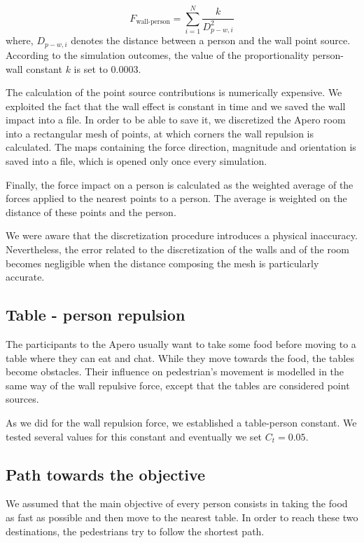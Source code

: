 \documentclass[11pt]{article}
\begin{document}
\begin{equation}
    F_{\text{wall-person}}=\sum_{i=1}^N\frac{k}{D^2_{p-w,i}}
\end{equation}
where, $D_{p-w,i}$ denotes the distance between a person and the wall point source. According to the simulation outcomes, the value of the proportionality person-wall constant $k$ is set to 0.0003.

The calculation of the point source contributions is numerically expensive. We exploited the fact that the wall effect is constant in time and we saved the wall impact into a file. In order to be able to save it, we discretized the Apero room into a rectangular mesh of points, at which corners the wall repulsion is calculated. The maps containing the force direction, magnitude and orientation is saved into a file, which is opened only once every simulation. 

Finally, the force impact on a person is calculated as the weighted average of the forces applied to the nearest points to a person. The average is weighted on the distance of these points and the person.

We were aware that the discretization procedure introduces a physical inaccuracy. Nevertheless, the error related to the discretization of the walls and of the room becomes negligible when the distance composing the mesh is particularly accurate.

\subsection{Table - person repulsion}
The participants to the Apero usually want to take some food before moving to a table where they can eat and chat. While they move towards the food, the tables become obstacles. Their influence on pedestrian's movement is modelled in the same way of the wall repulsive force, except that the tables are considered point sources.

As we did for the wall repulsion force, we established a table-person constant. We tested several values for this constant and eventually we set $C_t = 0.05$.

\subsection{Path towards the objective}
We assumed that the main objective of every person consists in taking the food as fast as possible and then move to the nearest table. In order to reach these two destinations, the pedestrians try to follow the shortest path.
\end{document}
